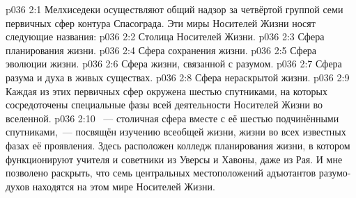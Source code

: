 \vs p036 2:1 Мелхиседеки осуществляют общий надзор за четвёртой группой семи первичных сфер контура Спасограда. Эти миры Носителей Жизни носят следующие названия:
\vs p036 2:2 Столица Носителей Жизни.
\vs p036 2:3 Сфера планирования жизни.
\vs p036 2:4 Сфера сохранения жизни.
\vs p036 2:5 Сфера эволюции жизни.
\vs p036 2:6 Сфера жизни, связанной с разумом.
\vs p036 2:7 Сфера разума и духа в живых существах.
\vs p036 2:8 Сфера нераскрытой жизни.
\vs p036 2:9 \pc Каждая из этих первичных сфер окружена шестью спутниками, на которых сосредоточены специальные фазы всей деятельности Носителей Жизни во вселенной.
\vs p036 2:10 \pc {}~--- столичная сфера вместе с её шестью подчинёнными спутниками,~--- посвящён изучению всеобщей жизни, жизни во всех известных фазах её проявления. Здесь расположен колледж планирования жизни, в котором функционируют учителя и советники из Уверсы и Хавоны, даже из Рая. И мне позволено раскрыть, что семь центральных местоположений адъютантов разумо\hyp{}духов находятся на этом мире Носителей Жизни.
